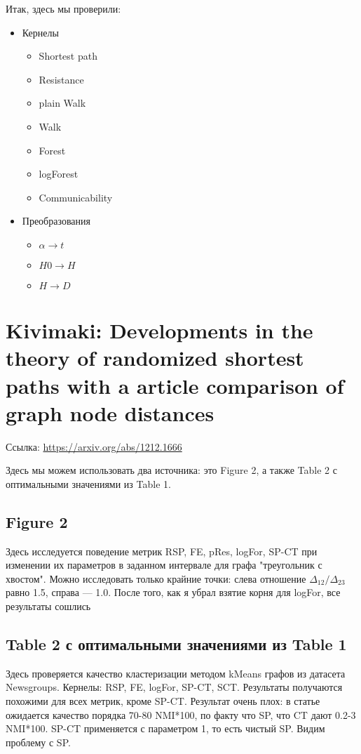 \documentclass{article}
\begin{document}
Итак, здесь мы проверили:
\begin{itemize}
  \item Кернелы
  \begin{itemize}
    \item Shortest path
    \item Resistance
    \item plain Walk
    \item Walk
    \item Forest
    \item logForest
    \item Communicability
  \end{itemize}
  \item Преобразования
  \begin{itemize}
    \item $\alpha \rightarrow t$
    \item $H0 \rightarrow H$
    \item $H \rightarrow D$
   \end{itemize}
\end{itemize}


\section{Kivimaki: Developments in the theory of randomized shortest paths with a article comparison of graph node distances}
Ссылка: \url{https://arxiv.org/abs/1212.1666}

Здесь мы можем использовать два источника: это Figure 2, а также Table 2 с оптимальными значениями из Table 1.

\subsection{Figure 2}
Здесь исследуется поведение метрик RSP, FE, pRes, logFor, SP-CT при изменении их параметров в заданном интервале для графа "треугольник с хвостом". Можно исследовать только крайние точки: слева отношение $\Delta_{12}/\Delta_{23}$ равно 1.5, справа --- 1.0.
После того, как я убрал взятие корня для logFor, все результаты сошлись

\subsection{Table 2 с оптимальными значениями из Table 1}
Здесь проверяется качество кластеризации методом kMeans графов из датасета Newsgroups. Кернелы: RSP, FE, logFor, SP-CT, SCT. Результаты получаются похожими для всех метрик, кроме SP-CT. Результат очень плох: в статье ожидается качество порядка 70-80 NMI*100, по факту что SP, что CT дают 0.2-3 NMI*100. SP-CT применяется с параметром 1, то есть чистый SP. Видим проблему с SP.
\end{document}
